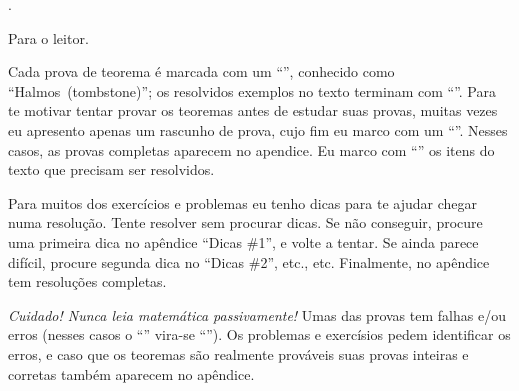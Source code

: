 
\chapteroid \prefacename.

\sectionoid Para o leitor.

Cada prova de teorema é marcada com um ``\thinspace\qedsymbol\thinspace'',
conhecido como ``Halmos\Halmos[tombstone]~(tombstone)'';
os resolvidos exemplos no texto terminam com ``\thinspace\qexsymbol\thinspace''.
Para te motivar tentar provar os teoremas antes de estudar suas provas,
muitas vezes eu apresento apenas um rascunho de prova,
cujo fim eu marco com um ``\thinspace\qessymbol\thinspace''.
Nesses casos, as provas completas aparecem no apendice.
Eu marco com ``\thinspace\activitysymbol\thinspace'' os itens do texto que
precisam ser resolvidos.

Para muitos dos exercícios e problemas eu tenho dicas para te ajudar chegar
numa resolução.  Tente resolver sem procurar dicas.
Se não conseguir, procure uma primeira dica no apêndice ``Dicas \#1'',
e volte a tentar.
Se ainda parece difícil, procure segunda dica no ``Dicas \#2'',
etc., etc.
Finalmente, no apêndice tem resoluções completas.

\emph{Cuidado! Nunca leia matemática passivamente!}
Umas das provas tem falhas e/ou erros
(nesses casos o ``\thinspace\qedsymbol\thinspace''
vira-se ``\thinspace\mistakesymbol\thinspace'').
Os problemas e exercísios pedem identificar os erros,
e caso que os teoremas são realmente prováveis suas provas
inteiras e corretas também aparecem no apêndice.

\endsectionoid

\endchapteroid
